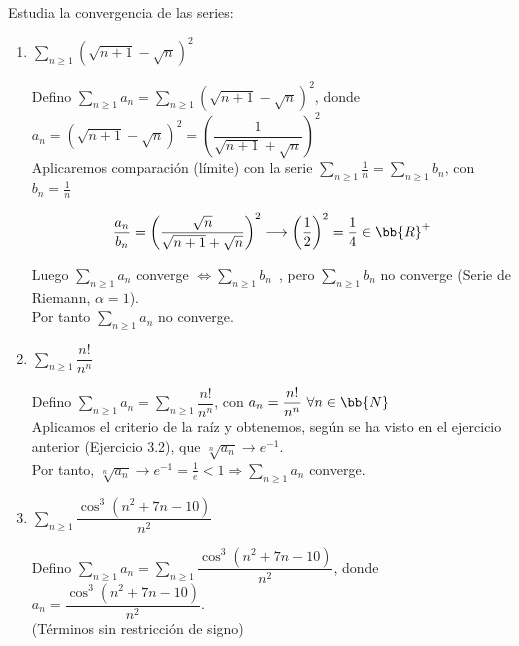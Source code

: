\documentclass[12pt]{article}
\begin{document}
    \begin{ejercicio}[3 puntos]
        Estudia la convergencia de las series:
        \begin{enumerate}
            \item $\sum\limits_{n\geq 1} \left(\sqrt{n+1}- \sqrt{n}\right)^2$

            Defino $\sum\limits_{n\geq 1}a_n = \sum\limits_{n\geq 1} \left(\sqrt{n+1}- \sqrt{n}\right)^2$, donde $a_n = \left(\sqrt{n+1}- \sqrt{n}\right)^2 = \left(\dfrac{1}{\sqrt{n+1} + \sqrt{n}} \right)^2$\\
            
            Aplicaremos comparación (límite) con la serie $\sum\limits_{n \geq 1}\frac{1}{n} = \sum\limits_{n \geq 1}b_n$, con $b_n=\frac{1}{n}$

            \[
                \dfrac{a_n}{b_n} = \left( \dfrac{\sqrt{n}}{\sqrt{n+1} + \sqrt{n}}\right)^2 \longrightarrow \left( \dfrac{1}{2} \right)^2 = \dfrac{1}{4} \in \bb{R}^+
            \]

            Luego $\sum\limits_{n \geq 1} a_n$ converge $\Longleftrightarrow \sum\limits_{n \geq 1} b_n$\, , pero $\sum\limits_{n \geq 1} b_n$ no converge (Serie de Riemann, $\alpha = 1$).\\

            Por tanto $\sum\limits_{n \geq 1} a_n$ no converge.
            
            \item $\sum\limits_{n\geq 1} \dfrac{n!}{n^n}$

            Defino $\sum\limits_{n \geq 1} a_n = \sum\limits_{n \geq 1} \dfrac{n!}{n^n}$, con $a_n = \dfrac{n!}{n^n} \,\, \forall n \in \bb{N}$\\
            
            Aplicamos el criterio de la raíz y obtenemos, según se ha visto en el ejercicio anterior (Ejercicio 3.2), que $\sqrt[n]{a_n} \longrightarrow e^{-1}$.\\
            
            Por tanto, $\sqrt[n]{a_n} \longrightarrow e^{-1}= \frac{1}{e}<1 \Longrightarrow \sum\limits_{n \geq 1}a_n$ converge. 
            
            \item $ \sum\limits_{n\geq 1} \dfrac{\cos^3(n^2 + 7n - 10)}{n^2}$

            Defino $\sum\limits_{n \geq 1} a_n = \sum\limits_{n\geq 1} \dfrac{\cos^3(n^2 + 7n - 10)}{n^2}$, donde $a_n = \dfrac{\cos^3(n^2 + 7n - 10)}{n^2}$.\\
            (Términos sin restricción de signo)\\


\end{enumerate}
\end{ejercicio}
\end{document}
